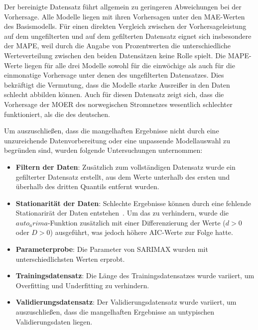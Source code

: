 Der bereinigte Datensatz führt allgemein zu geringeren Abweichungen bei der Vorhersage.
Alle Modelle liegen mit ihren Vorhersagen unter den \ac{MAE}-Werten des Basismodells.
Für einen direkten Vergleich zwischen der Vorhersageleistung auf dem ungefilterten und auf dem gefilterten Datensatz eignet sich insbesondere der \ac{MAPE}, weil durch die Angabe von Prozentwerten die unterschiedliche Werteverteilung zwischen den beiden Datensätzen keine Rolle spielt.
Die \ac{MAPE}-Werte liegen für alle drei Modelle sowohl für die einwöchige als auch für die einmonatige Vorhersage unter denen des ungefilterten Datensatzes.
Dies bekräftigt die Vermutung, dass die Modelle starke Ausreißer in den Daten schlecht abbilden können.
Auch für diesen Datensatz zeigt sich, dass die Vorhersage der \ac{MOER} des norwegischen Stromnetzes wesentlich schlechter funktioniert, als die des deutschen.

Um auszuschließen, dass die mangelhaften Ergebnisse nicht durch eine unzureichende Datenvorbereitung oder eine unpassende Modellauswahl zu begründen sind, wurden folgende Untersuchungen unternommen:
\begin{itemize}
 \item \textbf{Filtern der Daten}: Zusätzlich zum vollständigen Datensatz wurde ein gefilterter Datensatz erstellt, aus dem Werte unterhalb des ersten und überhalb des dritten Quantils entfernt wurden.
 \item \textbf{Stationarität der Daten}: Schlechte Ergebnisse können durch eine fehlende Stationarirät der Daten entstehen~\cite{}. Um das zu verhindern, wurde die $auto_arima$-Funktion zusätzlich mit einer Differenzierung der Werte ($d > 0$ oder $D > 0$) ausgeführt, was jedoch höhere \ac{AIC}-Werte zur Folge hatte.
 \item \textbf{Parameterprobe}: Die Parameter von \ac{SARIMAX} wurden mit unterschiedlichsten Werten erprobt.
 \item \textbf{Trainingsdatensatz}: Die Länge des Trainingsdatensatzes wurde variiert, um Overfitting und Underfitting zu verhindern.
 \item \textbf{Validierungsdatensatz}: Der Validierungsdatensatz wurde variiert, um auszuschließen, dass die mangelhaften Ergebnisse an untypischen Validierungsdaten liegen.
\end{itemize}


